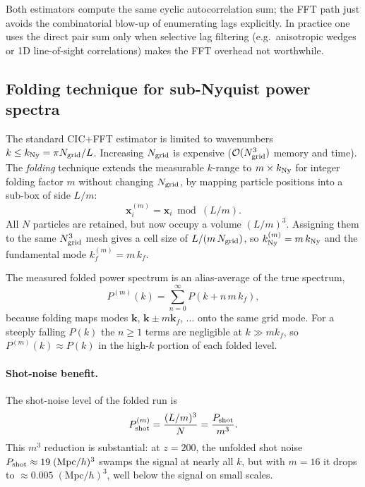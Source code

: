 \documentclass[12pt]{article}
\begin{document}
Both estimators compute the same cyclic autocorrelation sum; the FFT
path just avoids the combinatorial blow-up of enumerating lags
explicitly.  In practice one uses the direct pair sum only when
selective lag filtering (e.g.\ anisotropic wedges or 1D line-of-sight
correlations) makes the FFT overhead not worthwhile.

\subsection{Folding technique for sub-Nyquist power spectra}
\label{sec:folding}

The standard CIC+FFT estimator is limited to wavenumbers
$k \leq k_{\rm Ny} = \pi N_{\rm grid}/L$.  Increasing $N_{\rm grid}$
is expensive ($\mathcal{O}(N_{\rm grid}^3)$ memory and time).  The
\emph{folding} technique \citep{Jenkins1998} extends the measurable
$k$-range to $m\times k_{\rm Ny}$ for integer folding factor $m$
without changing $N_{\rm grid}$, by mapping particle positions into a
sub-box of side $L/m$:
\begin{equation}
  \mathbf{x}^{(m)}_i = \mathbf{x}_i \bmod (L/m).
  \label{eq:fold}
\end{equation}
All $N$ particles are retained, but now occupy a volume $(L/m)^3$.
Assigning them to the same $N_{\rm grid}^3$ mesh gives a cell size of
$L/(m\,N_{\rm grid})$, so $k_{\rm Ny}^{(m)} = m\,k_{\rm Ny}$ and the
fundamental mode $k_f^{(m)} = m\,k_f$.

The measured folded power spectrum is an alias-average of the true
spectrum,
\begin{equation}
  P^{(m)}(k) = \sum_{n=0}^{\infty} P(k + n\,m\,k_f),
  \label{eq:fold_alias}
\end{equation}
because folding maps modes $\mathbf{k}$, $\mathbf{k}\pm m\mathbf{k}_f$,
$\ldots$ onto the same grid mode.  For a steeply falling $P(k)$ the
$n \geq 1$ terms are negligible at $k \gg m k_f$, so $P^{(m)}(k)
\approx P(k)$ in the high-$k$ portion of each folded level.

\paragraph{Shot-noise benefit.}
The shot-noise level of the folded run is
\begin{equation}
  P_{\rm shot}^{(m)} = \frac{(L/m)^3}{N} = \frac{P_{\rm shot}}{m^3}.
  \label{eq:fold_shot}
\end{equation}
This $m^3$ reduction is substantial: at $z=200$, the unfolded shot
noise $P_{\rm shot} \approx 19\;(\mathrm{Mpc}/h)^3$ swamps the signal
at nearly all $k$, but with $m=16$ it drops to
$\approx 0.005\;(\mathrm{Mpc}/h)^3$, well below the signal on small
scales.
\end{document}
